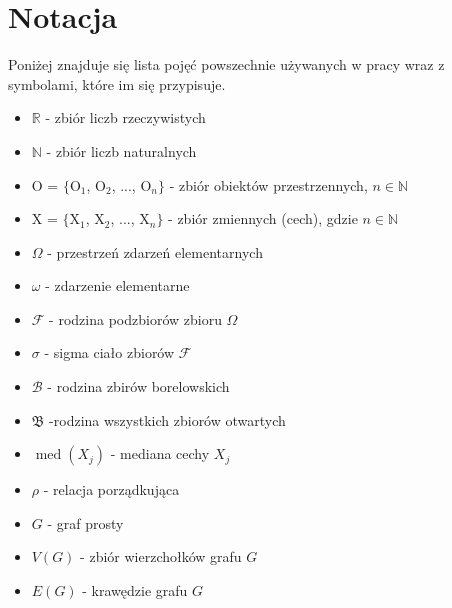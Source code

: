 \documentclass[12pt,a4paper]{report}
\newcommand{\mediana}{\operatorname{med}}
\begin{document}
\section{Notacja} 
\noindent

Poniżej znajduje się lista pojęć powszechnie używanych w pracy wraz z symbolami, które im się przypisuje. 
  
\begin{itemize}
\item $\mathbb{R}$ - zbiór liczb rzeczywistych
\item $\mathbb{N}$ - zbiór liczb naturalnych
\item O = $\{$O$_{1}$, O$_{2}$, ..., O$_{n}\}$ - zbiór obiektów przestrzennych, $n \in \mathbb{N}$
\item X = $\{$X$_{1}$, X$_{2}$, ..., X$_{n}\}$ - zbiór zmiennych (cech), gdzie $n \in \mathbb{N}$
\item $\Omega$ - przestrzeń zdarzeń elementarnych
\item $\omega$ - zdarzenie elementarne 
\item $\mathcal{F}$ - rodzina podzbiorów zbioru $\Omega$
\item $\sigma$ -  sigma ciało zbiorów $\mathcal{F}$
\item $\mathcal{B}$ - rodzina zbirów borelowskich
\item $\mathfrak{B}$ -rodzina wszystkich zbiorów otwartych %
\item $\mediana (X_{j})$ - mediana cechy $X_{j}$
\item $\rho$ - relacja porządkująca
\item $G$ - graf prosty
\item $V(G)$ - zbiór wierzchołków grafu $G$
\item $E(G)$ - krawędzie grafu $G$


\end{itemize}
\newpage
\end{document}
